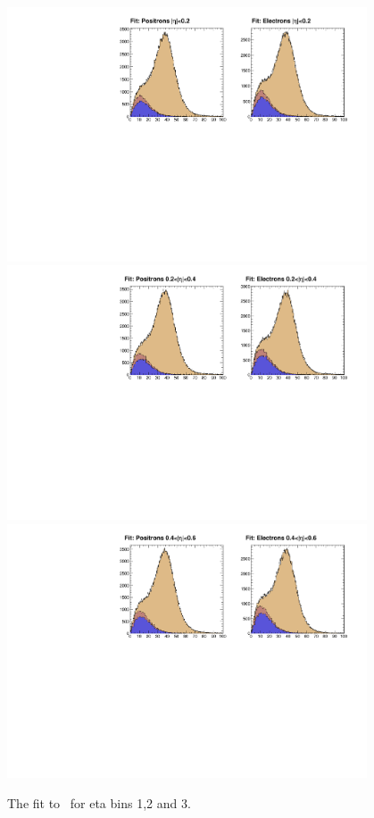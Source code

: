 \begin{figure}
  \begin{center}
    \includegraphics[width=0.95\textwidth]{data_0.pdf} \\
    \includegraphics[width=0.95\textwidth]{data_1.pdf} \\
    \includegraphics[width=0.95\textwidth]{data_2.pdf}
 \caption{  \label{fig:data1} The fit to \MET\ for eta bins 1,2 and 3.}
  \end{center}
\end{figure}

